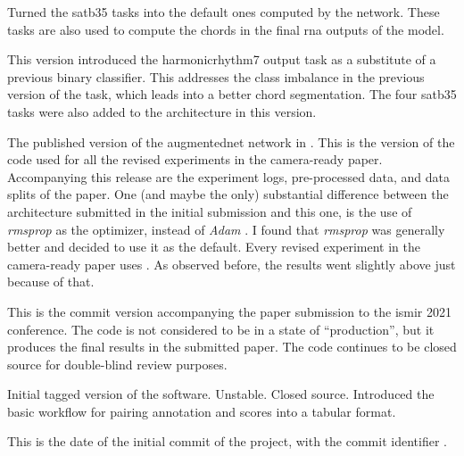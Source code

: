 Turned the \gls{satb35} tasks into the default ones computed
by the network. These tasks are also used to compute the
chords in the final \gls{rna} outputs of the model.

This version introduced the \gls{harmonicrhythm7} output
task as a substitute of a previous binary classifier. This
addresses the class imbalance in the previous version of the
task, which leads into a better chord segmentation. The four
\gls{satb35} tasks were also added to the architecture in
this version. 

The published version of the \gls{augmentednet} network in
\textcite{napoleslopez2021augmentednet}. This is the version
of the code used for all the revised experiments in the
camera-ready paper. Accompanying this release are the
experiment logs, pre-processed data, and data splits of the
paper. One (and maybe the only) substantial difference
between the architecture submitted in the initial submission
and this one, is the use of \emph{rmsprop} as the optimizer,
instead of \emph{Adam} \parencite{kingma2014adam}. I found
that \emph{rmsprop} was generally better and decided to use
it as the default. Every revised experiment in the
camera-ready paper uses . As observed before,
the results went slightly above just because of that.

This is the commit version accompanying the paper submission
to the \gls{ismir} 2021 conference. The code is not
considered to be in a state of ``production'', but it
produces the final results in the submitted paper. The code
continues to be closed source for double-blind review
purposes.

Initial tagged version of the software. Unstable. Closed
source. Introduced the basic workflow for pairing annotation
and scores into a tabular format.

This is the date of the initial commit of the project, with
the commit identifier .
    


